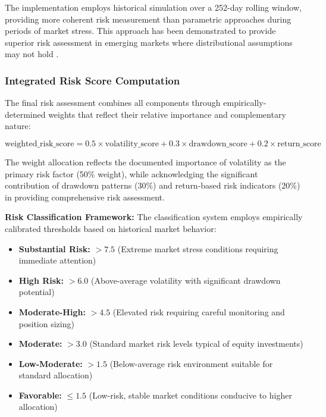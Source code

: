 \documentclass[3p,times,procedia]{elsarticle}
\begin{document}
The implementation employs historical simulation over a 252-day rolling window, providing more coherent risk measurement than parametric approaches during periods of market stress. This approach has been demonstrated to provide superior risk assessment in emerging markets where distributional assumptions may not hold \cite{Jorion2001}.

\subsubsection{{Integrated Risk Score Computation}}

The final risk assessment combines all components through empirically-determined weights that reflect their relative importance and complementary nature:

\begin{equation}
\text{weighted\_risk\_score} = 0.5 \times \text{volatility\_score} + 0.3 \times \text{drawdown\_score} + 0.2 \times \text{return\_score}
\end{equation}

The weight allocation reflects the documented importance of volatility as the primary risk factor (50\% weight), while acknowledging the significant contribution of drawdown patterns (30\%) and return-based risk indicators (20\%) in providing comprehensive risk assessment.

\textbf{Risk Classification Framework:}
The classification system employs empirically calibrated thresholds based on historical market behavior:
\begin{itemize}
    \vspace{0.5cm}
    \item \textbf{Substantial Risk:} $> 7.5$ (Extreme market stress conditions requiring immediate attention)
    \item \textbf{High Risk:} $> 6.0$ (Above-average volatility with significant drawdown potential)
    \item \textbf{Moderate-High:} $> 4.5$ (Elevated risk requiring careful monitoring and position sizing)
    \item \textbf{Moderate:} $> 3.0$ (Standard market risk levels typical of equity investments)
    \item \textbf{Low-Moderate:} $> 1.5$ (Below-average risk environment suitable for standard allocation)
    \item \textbf{Favorable:} $\leq 1.5$ (Low-risk, stable market conditions conducive to higher allocation)
\end{itemize} 
\end{document}
